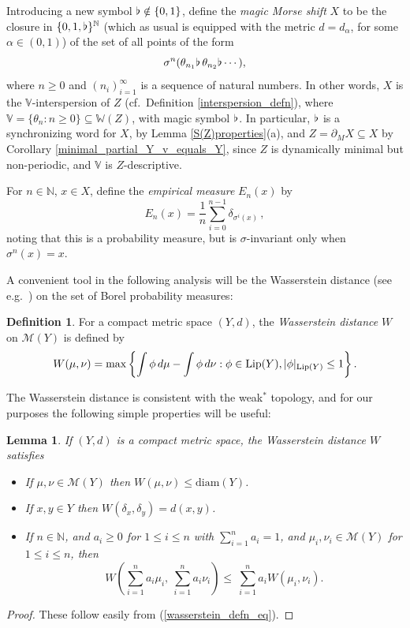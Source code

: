 \documentclass[reqno,11pt]{amsart}
\newtheorem{lem}[thm]{Lemma}
\theoremstyle{definition}
\newtheorem{defn}[thm]{Definition}
\theoremstyle{remark}
\theoremstyle{remark}
\def \N {\mathbb N}
\def\m{\mathcal M}
\def\lip{{\rm Lip}}
\def\w{\mathbb{W}}
\def\v{\mathbb V}
\def\b{\kern 0.02em \flat \kern 0.02em}
\numberwithin{equation}{section}
\begin{document}
Introducing a new symbol $\b\notin\{0,1\}$, define the \emph{magic Morse shift} $X$
to be the closure in $\{0,1,\b\}^\N$ (which as usual is equipped with the metric $d=d_\alpha$, for some $\alpha\in(0,1)$)
of the set of all points of the form
$$
\sigma^n(\theta_{n_1}\b\, \theta_{n_2}\b\cdots),
$$
where $n\ge 0$
and $(n_i)_{i=1}^\infty$  is a sequence
of natural numbers.
In other words, $X$ is the $\v$-interspersion of $Z$ (cf.~Definition \ref{interspersion_defn}),
where $\v=\{\theta_n: n\ge 0\}\subseteq \w(Z)$, with magic symbol $\b$.
In particular,
$\b$ is
a synchronizing word for $X$, 
by  Lemma \ref{S(Z)properties}(a),
and $Z = \partial_M X \subseteq X$ by Corollary \ref{minimal_partial_Y_v_equals_Y},
since $Z$ is dynamically minimal but non-periodic,
and $\v$ is $Z$-descriptive.

For $n\in\N$, $x\in X$, define the \emph{empirical measure} $E_n(x)$ by
$$
E_n(x)=\frac{1}{n}\sum_{i=0}^{n-1} \delta_{\sigma^i(x)}\,,
$$
noting that this is a probability measure, but is $\sigma$-invariant only when $\sigma^n(x)=x$.



A convenient tool in the following analysis will be the Wasserstein distance 
(see e.g.~\cite{villani, villani2}) 
on the set of Borel probability measures:


\begin{defn}\label{wassersteindefn}
For a compact metric space $(Y,d)$, the \emph{Wasserstein distance} $W$ on $\m(Y)$ is defined by
\begin{equation}\label{wasserstein_defn_eq}
W(\mu,\nu)= \max\left\{ \int \phi\, d\mu - \int \phi\, d\nu : \phi\in\lip(Y), |\phi|_{\lip(Y)}\le 1\right\}.
\end{equation}
\end{defn}

The Wasserstein distance
 is consistent with the weak$^*$ topology, and for our purposes the following simple properties
will be useful:

\begin{lem}\label{wasserstein_lemma}
If $(Y,d)$ is a compact metric space, the Wasserstein distance $W$ satisfies
\begin{itemize}
\item[(a)] If $\mu,\nu\in\m(Y)$ then $W(\mu,\nu)\le \text{diam}(Y)$.
\item[(b)] If $x,y\in Y$ then $W(\delta_x,\delta_y)=d(x,y)$.
\item[(c)] If $n\in\N$, and  $a_i\ge0$ for $1\le i\le n$ with $\sum_{i=1}^n a_i=1$,  and $\mu_i,\nu_i\in\m(Y)$  for $1\le i\le n$,
then 
$$
W\left( \sum_{i=1}^n a_i \mu_i, \ \sum_{i=1}^n a_i \nu_i \right)
\le \
\sum_{i=1}^n a_i  W(\mu_i, \nu_i ).
$$
\end{itemize}
\end{lem}
\begin{proof}
These follow easily from
(\ref{wasserstein_defn_eq}).
\end{proof}
\end{document}

